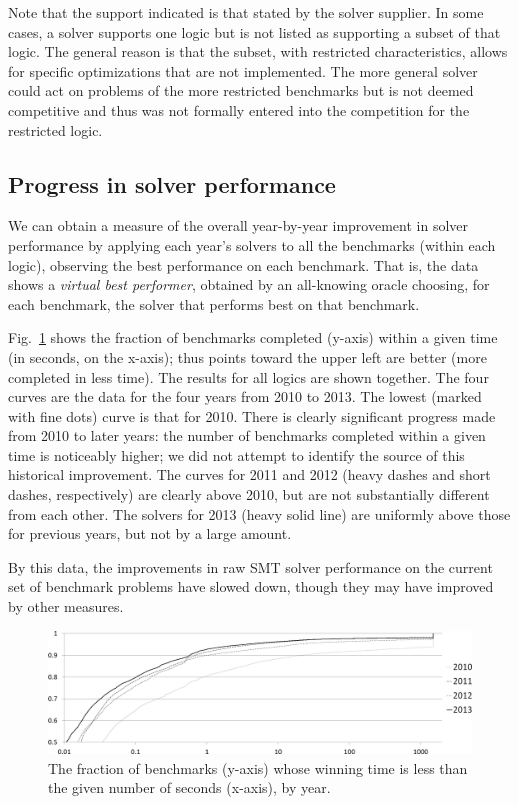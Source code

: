 \documentclass[smallcondensed]{svjour3}
\begin{document}
Note that the support indicated is that stated by the solver supplier. In some cases, a solver supports one logic but is not listed as supporting a subset of that logic. The general reason is that the subset, with restricted characteristics, allows for specific optimizations that are not implemented. The more general solver could act on problems of the
more restricted benchmarks but is not deemed competitive and thus was not formally entered into the competition for the restricted logic.


\subsection{Progress in solver performance}
\label{Progress}

We can obtain a measure of the overall year-by-year improvement in solver performance by applying each year's solvers to all the benchmarks (within each logic), observing the best performance on each benchmark. That is, the data shows a {\em virtual best performer}, obtained by an all-knowing oracle choosing, for each benchmark, the solver that performs best on that benchmark.

Fig.~\ref{Fig:CumulativeTimes} shows the fraction of benchmarks completed (y-axis) within a given time (in seconds, on the x-axis); thus points toward the upper left are better (more completed in less time). The results for all logics are shown together. 
The four curves are the data for the four years from 2010 to 2013. The lowest (marked with fine dots) curve is that for 2010. 
There is clearly significant progress made from 2010 to later years: the number of benchmarks completed within a given time is noticeably higher; we did not attempt to identify the source of this historical improvement. The curves for 2011 and 2012 (heavy dashes and short dashes, respectively) are clearly above 2010, but are not substantially different from each other. The solvers for 2013 (heavy solid line) are uniformly above those for previous years, but not by a large amount.  

By this data, the improvements in raw SMT solver performance on the current set of benchmark problems have slowed down, though they may have improved by other measures.

\begin{figure}
\centering
\includegraphics[width=.95\textwidth]{CumulativeTimes}
\caption{The fraction of benchmarks (y-axis) whose winning time is less than the given number of seconds (x-axis), by year.}
\label{Fig:CumulativeTimes}
\end{figure}
\end{document}
